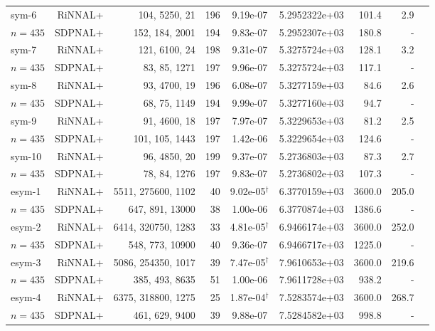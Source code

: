 \documentclass[11pt]{article}
\theoremstyle{plain}
\begin{document}
\begin{footnotesize}
\begin{longtable}[c]{lrrrccrrr}
sym-6& RiNNAL+ & 104, 5250, 21 & 196 & 9.19e-07 & 5.2952322e+03 & 101.4 &2.9 \\ 
$n=435$ & SDPNAL+ & 152, 184, 2001 & 194& 9.83e-07 & 5.2952307e+03 & 180.8 & - \\ [3pt] 

sym-7& RiNNAL+ & 121, 6100, 24 & 198 & 9.31e-07 & 5.3275724e+03 & 128.1 &3.2 \\ 
$n=435$ & SDPNAL+ & 83, 85, 1271 & 197& 9.96e-07 & 5.3275724e+03 & 117.1 & - \\ [3pt] 

sym-8& RiNNAL+ & 93, 4700, 19 & 196 & 6.08e-07 & 5.3277159e+03 & 84.6 &2.6 \\ 
$n=435$ & SDPNAL+ & 68, 75, 1149 & 194& 9.99e-07 & 5.3277160e+03 & 94.7 & - \\ [3pt] 

sym-9& RiNNAL+ & 91, 4600, 18 & 197 & 7.97e-07 & 5.3229653e+03 & 81.2 &2.5 \\ 
$n=435$ & SDPNAL+ & 101, 105, 1443 & 197& 1.42e-06 & 5.3229654e+03 & 124.6 & - \\ [3pt] 

sym-10& RiNNAL+ & 96, 4850, 20 & 199 & 9.37e-07 & 5.2736803e+03 & 87.3 &2.7 \\ 
$n=435$ & SDPNAL+ & 78, 84, 1276 & 197& 9.83e-07 & 5.2736802e+03 & 107.3 & - \\ [3pt] 

esym-1& RiNNAL+ & 5511, 275600, 1102 & 40 & 9.02e-05$^{\dagger}$ & 6.3770159e+03 & 3600.0 &205.0 \\ 
$n=435$ & SDPNAL+ & 647, 891, 13000 & 38& 1.00e-06 & 6.3770874e+03 & 1386.6 & - \\ [3pt] 

esym-2& RiNNAL+ & 6414, 320750, 1283 & 33 & 4.81e-05$^{\dagger}$ & 6.9466174e+03 & 3600.0 &252.0 \\ 
$n=435$ & SDPNAL+ & 548, 773, 10900 & 40& 9.36e-07 & 6.9466717e+03 & 1225.0 & - \\ [3pt] 

esym-3& RiNNAL+ & 5086, 254350, 1017 & 39 & 7.47e-05$^{\dagger}$ & 7.9610653e+03 & 3600.0 &219.6 \\ 
$n=435$ & SDPNAL+ & 385, 493, 8635 & 51& 1.00e-06 & 7.9611728e+03 & 938.2 & - \\ [3pt] 

esym-4& RiNNAL+ & 6375, 318800, 1275 & 25 & 1.87e-04$^{\dagger}$ & 7.5283574e+03 & 3600.0 &268.7 \\ 
$n=435$ & SDPNAL+ & 461, 629, 9400 & 39& 9.88e-07 & 7.5284582e+03 & 998.8 & - \\ [3pt] 


\end{longtable}
\end{footnotesize}
\end{document}
